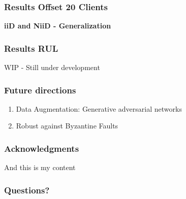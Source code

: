 \documentclass[9pt]{beamer}
\begin{document}
\begin{frame}
\frametitle{Results Offset 20 Clients}

\textbf{iiD and NiiD - Generalization}









\end{frame}




\begin{frame}
\frametitle{Results RUL}
WIP - Still under development
\end{frame}




\begin{frame}
\frametitle{Future directions}
\begin{enumerate}
    \item Data Augmentation: Generative adversarial networks 
    \item Robust against Byzantine Faults 
\end{enumerate}



\end{frame}

\begin{frame}
\frametitle{Acknowledgments}
And this is my content
\end{frame}

\begin{frame}
\frametitle{Questions?}

\end{frame}
\end{document}
